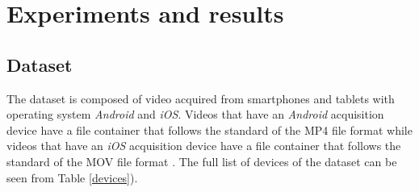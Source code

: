 \chapter{Experiments and results}

\section{Dataset}

The dataset is composed of video acquired from smartphones and tablets with operating system \emph{Android} and \emph{iOS}. 
Videos that have an \emph{Android} acquisition device have a file container that follows the standard of the MP4 \cite{mp4} file format while videos that have an \emph{iOS} acquisition device have a file container that follows the standard of the MOV file format \cite{mov}.
The full list of devices of the dataset can be seen from Table \ref{devices}). 

